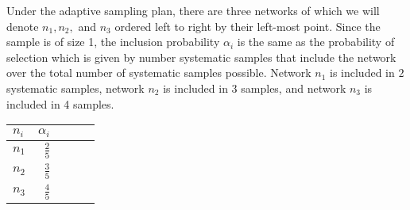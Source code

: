 \documentclass[usenames,dvipsnames]{homework}
\begin{document}

\begin{solution}
\begin{minipage}{.8\textwidth}
  Under the adaptive sampling plan, there are three networks of which we will denote $n_1,n_2,$ and $n_3$ ordered left to right by their left-most point.  Since the sample is of size 1, the inclusion probability $\alpha_i$ is the same as the probability of selection which is given by number systematic samples that include the network over the total number of systematic samples possible.  Network $n_1$ is included in $2$ systematic samples, network $n_2$ is included in $3$ samples, and network $n_3$ is included in 4 samples.  
\end{minipage}
\begin{minipage}{.15\textwidth}
\begin{center}
\renewcommand{\arraystretch}{1.3}
\begin{tabular}{l r c r r}
\hline
$n_i$ & $\alpha_i$  \\\hline
$n_1$ & $\frac 25$  \\
$n_2$ & $\frac 35$  \\
$n_3$ & $\frac 45$  \\
\hline
\end{tabular}
\end{center}
\end{minipage}
\end{solution}


\end{document}
